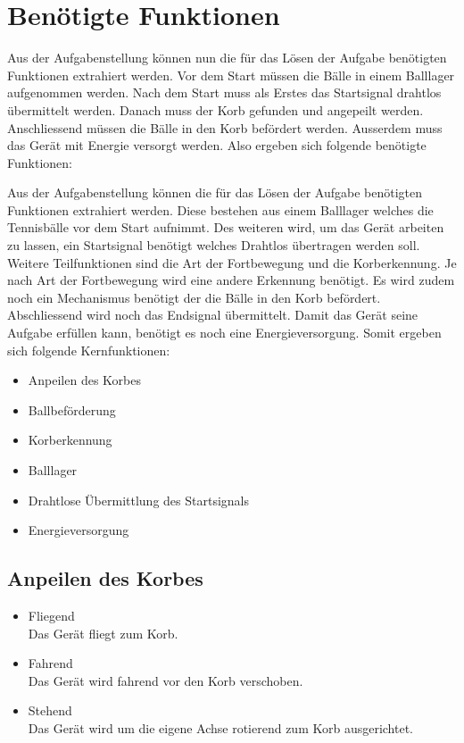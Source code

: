 \section{Benötigte Funktionen}
Aus der Aufgabenstellung können nun die für das Lösen der Aufgabe benötigten 
Funktionen extrahiert werden. Vor dem Start müssen die Bälle in einem Balllager 
aufgenommen werden. Nach dem Start muss als Erstes das Startsignal drahtlos 
übermittelt werden. Danach muss der Korb gefunden und angepeilt werden. 
Anschliessend müssen die Bälle in den Korb befördert werden. Ausserdem muss 
das Gerät mit Energie versorgt werden. Also ergeben sich folgende benötigte 
Funktionen: 

Aus der Aufgabenstellung können die für das Lösen der Aufgabe benötigten Funktionen extrahiert werden.
Diese bestehen aus einem Balllager welches die Tennisbälle vor dem Start aufnimmt. Des weiteren wird,
um das Gerät arbeiten zu lassen, ein Startsignal benötigt welches Drahtlos übertragen werden soll. Weitere
Teilfunktionen sind die Art der Fortbewegung und die Korberkennung. Je nach Art der Fortbewegung wird eine 
andere Erkennung benötigt. Es wird zudem noch ein Mechanismus benötigt der die Bälle in den Korb befördert.
Abschliessend wird noch das Endsignal übermittelt.
Damit das Gerät seine Aufgabe erfüllen kann, benötigt es noch eine Energieversorgung.
Somit ergeben sich folgende Kernfunktionen:

\begin{itemize}
    \item Anpeilen des Korbes
    \item Ballbeförderung
    \item Korberkennung
    \item Balllager
    \item Drahtlose Übermittlung des Startsignals
    \item Energieversorgung
\end{itemize}

\subsection{Anpeilen des Korbes}
\begin{itemize}
    \item Fliegend \\
        Das Gerät fliegt zum Korb. 
    \item Fahrend \\
        Das Gerät wird fahrend vor den Korb verschoben. 
    \item Stehend \\
        Das Gerät wird um die eigene Achse rotierend zum Korb ausgerichtet. 
\end{itemize}

